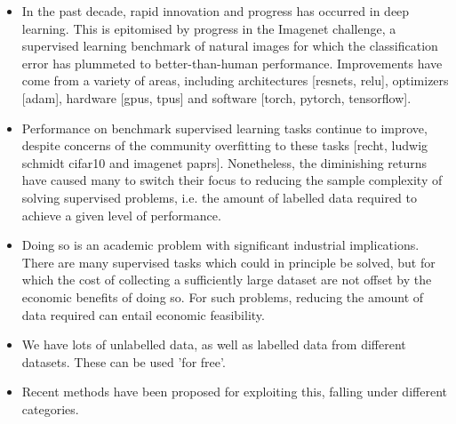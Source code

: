 \begin{itemize}
	\item In the past decade, rapid innovation and progress has occurred in deep learning. This is epitomised by progress in the Imagenet challenge, a supervised learning benchmark of natural images for which the classification error has plummeted to better-than-human performance. Improvements have come from a variety of areas, including architectures [resnets, relu], optimizers [adam], hardware [gpus, tpus] and software [torch, pytorch, tensorflow]. 
	\item Performance on benchmark supervised learning tasks continue to improve, despite concerns of the community overfitting to these tasks [recht, ludwig schmidt cifar10 and imagenet paprs]. Nonetheless, the diminishing returns have caused many to switch their focus to reducing the sample complexity of solving supervised problems, i.e. the amount of labelled data required to achieve a given level of performance.
	\item Doing so is an academic problem with significant industrial implications. There are many supervised tasks which could in principle be solved, but for which the cost of collecting a sufficiently large dataset are not offset by the economic benefits of doing so. For such problems, reducing the amount of data required can entail economic feasibility.
	\item We have lots of unlabelled data, as well as labelled data from different datasets. These can be used 'for free'. 
	\item Recent methods have been proposed for exploiting this, falling under different categories. 
\end{itemize}




